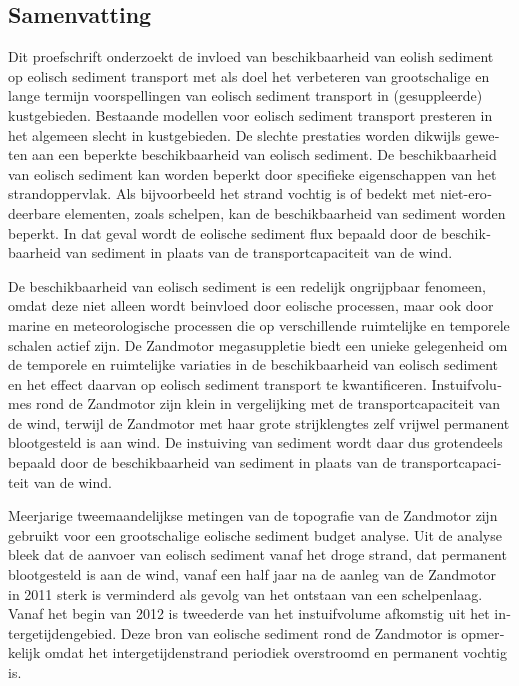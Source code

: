\begin{otherlanguage}{dutch}
\chapter*{Samenvatting}
Dit proefschrift onderzoekt de invloed van beschikbaarheid van eolish
sediment op eolisch sediment transport met als doel het verbeteren van
grootschalige en lange termijn voorspellingen van eolisch sediment
transport in (gesuppleerde) kustgebieden. Bestaande modellen voor
eolisch sediment transport presteren in het algemeen slecht in
kustgebieden. De slechte prestaties worden dikwijls geweten aan een
beperkte beschikbaarheid van eolisch sediment. De beschikbaarheid van
eolisch sediment kan worden beperkt door specifieke eigenschappen van
het strandoppervlak. Als bijvoorbeeld het strand vochtig is of bedekt
met niet-erodeerbare elementen, zoals schelpen, kan de beschikbaarheid
van sediment worden beperkt. In dat geval wordt de eolische sediment
flux bepaald door de beschikbaarheid van sediment in plaats van de
transportcapaciteit van de wind.

De beschikbaarheid van eolisch sediment is een redelijk ongrijpbaar
fenomeen, omdat deze niet alleen wordt be{\:i}nvloed door eolische
processen, maar ook door marine en meteorologische processen die op
verschillende ruimtelijke en temporele schalen actief zijn. De
Zandmotor megasuppletie biedt een unieke gelegenheid om de temporele
en ruimtelijke variaties in de beschikbaarheid van eolisch sediment en
het effect daarvan op eolisch sediment transport te
kwantificeren. Instuifvolumes rond de Zandmotor zijn klein in
vergelijking met de transportcapaciteit van de wind, terwijl de
Zandmotor met haar grote strijklengtes zelf vrijwel permanent
blootgesteld is aan wind. De instuiving van sediment wordt daar dus
grotendeels bepaald door de beschikbaarheid van sediment in plaats van
de transportcapaciteit van de wind.

Meerjarige tweemaandelijkse metingen van de topografie van de
Zandmotor zijn gebruikt voor een grootschalige eolische sediment
budget analyse. Uit de analyse bleek dat de aanvoer van eolisch
sediment vanaf het droge strand, dat permanent blootgesteld is aan de
wind, vanaf een half jaar na de aanleg van de Zandmotor in 2011 sterk
is verminderd als gevolg van het ontstaan van een schelpenlaag. Vanaf
het begin van 2012 is tweederde van het instuifvolume afkomstig uit
het intergetijdengebied. Deze bron van eolische sediment rond de
Zandmotor is opmerkelijk omdat het intergetijdenstrand periodiek
overstroomd en permanent vochtig is.


\end{otherlanguage}
